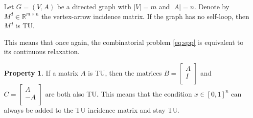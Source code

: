\documentclass[12pt, openany]{report}
\newcommand{\R}{\mathbb{R}}
\theoremstyle{definition}
\newtheorem{prop}[thm]{Property}
\begin{document}
\begin{tcolorbox}[breakable,
    colback=white,
    colframe=white!75!black,
    title={Theorem}]
    Let \(G=(V,A)\) be a directed graph with \(|V|=m\) and \(|A|=n\). Denote by \(M^d\in\R^{m\times n}\) the vertex-arrow incidence matrix. If the graph has no self-loop, then \(M^d\) is TU.
\end{tcolorbox}
This means that once again, the combinatorial problem \eqref{eq:spp} is equivalent to its continuous relaxation. 
\begin{prop}
    If a matrix \(A\) is TU, then the matrices \(B=\begin{bmatrix}
        A \\
        I \\
    \end{bmatrix}\) and \(C=\begin{bmatrix}
        A\\ -A\\
    \end{bmatrix}\) are both also TU. This means that the condition \(x\in [0,1]^n\) can always be added to the TU incidence matrix and stay TU.
\end{prop}
\end{document}
